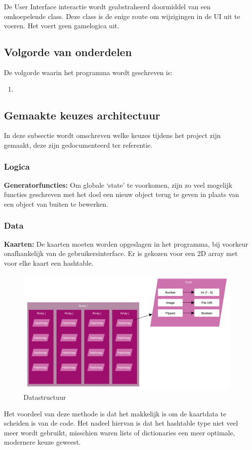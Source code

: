 \documentclass[a4paper,titlepage,11pt]{article}
\begin{document}
De User Interface interactie wordt geabstraheerd doormiddel van een omkoepelende class.
Deze class is de enige route om wijzigingen in de UI uit te voeren.
Het voert geen gamelogica uit.

\subsection{Volgorde van onderdelen}

De volgorde waarin het programma wordt geschreven is:
\begin{enumerate}
\item 
\end{enumerate}

\subsection{Gemaakte keuzes architectuur}

In deze subsectie wordt omschreven welke keuzes tijdens het project zijn gemaakt,
deze zijn gedocumenteerd ter referentie.

\subsubsection{Logica}

{\bf Generatorfuncties:}
Om globale `state' te voorkomen, zijn zo veel mogelijk functies geschreven met
het doel een nieuw object terug te geven in plaats van een object van buiten te bewerken.

\subsubsection{Data}

{\bf Kaarten:}
De kaarten moeten worden opgeslagen in het programma,
bij voorkeur onafhankelijk van de gebruikersinterface.
Er is gekozen voor een 2D array met voor elke kaart een hashtable.

\begin{figure}[!hb]
  \includegraphics[width=\linewidth]{../Images/datastructure.pdf}
  \caption{Datastructuur}\label{fig:datastructure}
\end{figure}

Het voordeel van deze methode is dat het makkelijk is om de kaartdata te scheiden is
van de code.
Het nadeel hiervan is dat het hashtable type niet veel meer wordt gebruikt, misschien
waren lists of dictionaries een meer optimale, modernere keuze geweest.
\end{document}
